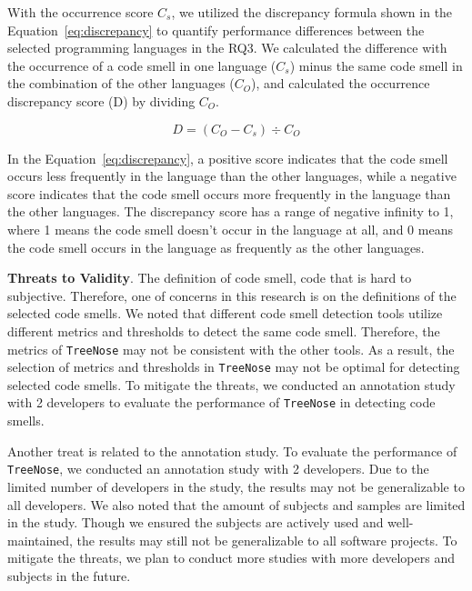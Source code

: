
With the occurrence score $C_{s}$, we utilized the discrepancy formula shown in the Equation~\ref{eq:discrepancy}
to quantify performance differences between the selected programming languages in the RQ3. We calculated the difference with the occurrence of
a code smell in one
language ($C_{s}$) minus the same code smell in the combination of the other languages ($C_{O}$), and calculated the occurrence discrepancy score
(D) by dividing $C_{O}$.

\vspace{-1.0em}

\begin{equation}
    D = (C_{O} - C_{s}) \div C_{O}
    \label{eq:discrepancy}
\end{equation}

In the Equation~\ref{eq:discrepancy}, a positive score indicates that the code smell occurs less
frequently in the language than the other languages, while a negative score
indicates that the code smell occurs more frequently in the language than the
other languages. The discrepancy score has a range of negative infinity to 1,
where 1 means the code smell doesn't occur in the language at all, and 0 means
the code smell occurs in the language as frequently as the other languages.

{\bf Threats to Validity}. The definition of code smell, code that is hard to
subjective. Therefore, one of concerns in this research is on the definitions
of the selected code smells. We noted that different code smell detection tools
utilize different metrics and thresholds to detect the same code smell.
Therefore, the metrics of \texttt{TreeNose} may not be consistent with the
other tools. As a result, the selection of metrics and thresholds in
\texttt{TreeNose} may not be optimal for detecting selected code smells. To
mitigate the threats, we conducted an annotation study with 2 developers to
evaluate the performance of \texttt{TreeNose} in detecting code smells.

Another treat is related to the annotation study. To evaluate the performance
of \texttt{TreeNose}, we conducted an annotation study with 2 developers. Due
to the limited number of developers in the study, the results may not be
generalizable to all developers. We also noted that the amount of subjects and
samples are limited in the study. Though we ensured the subjects are actively
used and well-maintained, the results may still not be generalizable to all
software projects. To mitigate the threats, we plan to conduct more studies
with more developers and subjects in the future.

